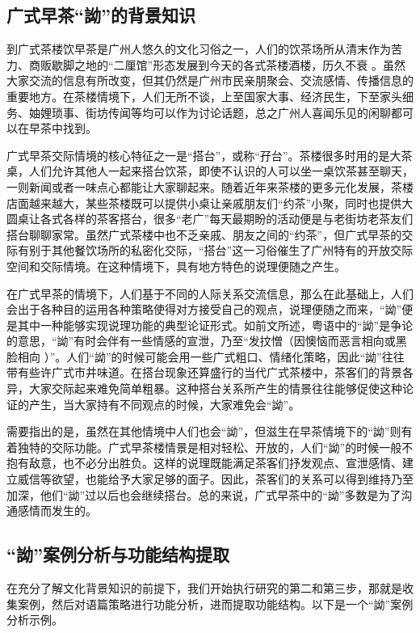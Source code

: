 \documentclass[b5paper,10.5pt,onecolumn,twoside,leqno,UTF8]{article}
\begin{document}
\subsection{广式早茶“詏”的背景知识}

到广式茶楼饮早茶是广州人悠久的文化习俗之一，人们的饮茶场所从清末作为苦力、商贩歇脚之地的“二厘馆”形态发展到今天的各式茶楼酒楼，历久不衰 。虽然大家交流的信息有所改变，但其仍然是广州市民亲朋聚会、交流感情、传播信息的重要地方。在茶楼情境下，人们无所不谈，上至国家大事、经济民生，下至家头细务、妯娌琐事、街坊传闻等均可以作为讨论话题，总之广州人喜闻乐见的闲聊都可以在早茶中找到。

广式早茶交际情境的核心特征之一是“搭台”，或称“孖台”。茶楼很多时用的是大茶桌，人们允许其他人一起来搭台饮茶，即使不认识的人可以坐一桌饮茶甚至聊天，一则新闻或者一味点心都能让大家聊起来。随着近年来茶楼的更多元化发展，茶楼店面越来越大，某些茶楼既可以提供小桌让亲戚朋友们“约茶”小聚，同时也提供大圆桌让各式各样的茶客搭台，很多“老广”每天最期盼的活动便是与老街坊老茶友们搭台聊聊家常。虽然广式茶楼中也不乏亲戚、朋友之间的“约茶”，但广式早茶的交际有别于其他餐饮场所的私密化交际，“搭台”这一习俗催生了广州特有的开放交际空间和交际情境。在这种情境下，具有地方特色的说理便随之产生。

在广式早茶的情境下，人们基于不同的人际关系交流信息，那么在此基础上，人们会出于各种目的运用各种策略使得对方接受自己的观点，说理便随之而来，“詏”便是其中一种能够实现说理功能的典型论证形式。如前文所述，粤语中的“詏”是争论的意思，“詏”有时会伴有一些情感的宣泄，乃至“发抆憎（因懊恼而恶言相向或黑脸相向 ）”。人们“詏”的时候可能会用一些广式粗口、情绪化策略，因此“詏”往往带有些许广式市井味道。在搭台现象还算盛行的当代广式茶楼中，茶客们的背景各异，大家交际起来难免简单粗暴。这种搭台关系所产生的情景往往能够促使这种论证的产生，当大家持有不同观点的时候，大家难免会“詏”。

需要指出的是，虽然在其他情境中人们也会“詏”，但滋生在早茶情境下的“詏”则有着独特的交际功能。广式早茶楼情景是相对轻松、开放的，人们“詏”的时候一般不抱有敌意，也不必分出胜负。这样的说理既能满足茶客们抒发观点、宣泄感情、建立威信等欲望，也能给予大家足够的面子。因此，茶客们的关系可以得到维持乃至加深，他们“詏”过以后也会继续搭台。总的来说，广式早茶中的“詏”多数是为了沟通感情而发生的。

\subsection{“詏”案例分析与功能结构提取}
在充分了解文化背景知识的前提下，我们开始执行研究的第二和第三步，那就是收集案例，然后对语篇策略进行功能分析，进而提取功能结构。以下是一个“詏”案例分析示例。
\end{document}
